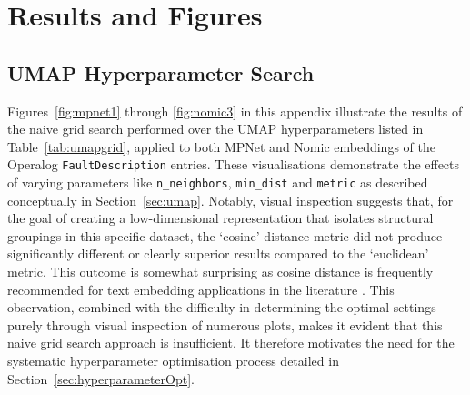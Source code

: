 \documentclass[10pt,oneside]{report}
\begin{document}
\appendix

\chapter{Results and Figures}
\section{UMAP Hyperparameter Search} \label{app:umaphypgrid}
Figures~\ref{fig:mpnet1} through \ref{fig:nomic3} in this appendix illustrate the results of the naive grid search performed over the UMAP hyperparameters listed in Table~\ref{tab:umapgrid}, applied to both MPNet and Nomic embeddings of the Operalog \texttt{FaultDescription} entries. These visualisations demonstrate the effects of varying parameters like \texttt{n\_neighbors}, \texttt{min\_dist} and \texttt{metric} as described conceptually in Section~\ref{sec:umap}. Notably, visual inspection suggests that, for the goal of creating a low-dimensional representation that isolates structural groupings in this specific dataset, the `cosine' distance metric did not produce significantly different or clearly superior results compared to the `euclidean' metric. This outcome is somewhat surprising as cosine distance is frequently recommended for text embedding applications in the literature \cite{cao2024recent, baba2017plagiarism}. This observation, combined with the difficulty in determining the optimal settings purely through visual inspection of numerous plots, makes it evident that this naive grid search approach is insufficient. It therefore motivates the need for the systematic hyperparameter optimisation process detailed in Section~\ref{sec:hyperparameterOpt}.
\end{document}
